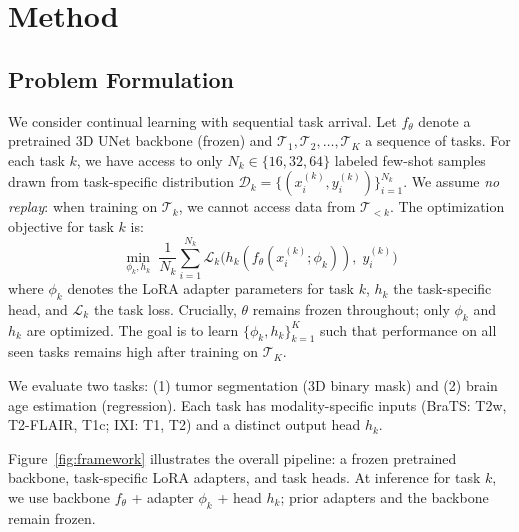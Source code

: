 \documentclass[journal,twoside,web]{ieeecolor}
\begin{document}
\section{Method}
\label{sec:method}

\subsection{Problem Formulation}
\label{sec:problem}

We consider continual learning with sequential task arrival. Let $f_\theta$ denote a pretrained 3D UNet backbone (frozen) and $\mathcal{T}_1, \mathcal{T}_2, \ldots, \mathcal{T}_K$ a sequence of tasks. For each task $k$, we have access to only $N_k \in \{16, 32, 64\}$ labeled few-shot samples drawn from task-specific distribution $\mathcal{D}_k = \{(x_i^{(k)}, y_i^{(k)})\}_{i=1}^{N_k}$. We assume \emph{no replay}: when training on $\mathcal{T}_k$, we cannot access data from $\mathcal{T}_{<k}$. The optimization objective for task $k$ is:
\begin{equation}
\min_{\phi_k, h_k} \; \frac{1}{N_k} \sum_{i=1}^{N_k} \mathcal{L}_k \bigl( h_k(f_\theta(x_i^{(k)}; \phi_k)),\; y_i^{(k)} \bigr)
\label{eq:objective}
\end{equation}
where $\phi_k$ denotes the LoRA adapter parameters for task $k$, $h_k$ the task-specific head, and $\mathcal{L}_k$ the task loss. Crucially, $\theta$ remains frozen throughout; only $\phi_k$ and $h_k$ are optimized. The goal is to learn $\{\phi_k, h_k\}_{k=1}^K$ such that performance on all seen tasks remains high after training on $\mathcal{T}_K$.

We evaluate two tasks: (1) tumor segmentation (3D binary mask) and (2) brain age estimation (regression). Each task has modality-specific inputs (BraTS: T2w, T2-FLAIR, T1c; IXI: T1, T2) and a distinct output head $h_k$.

Figure~\ref{fig:framework} illustrates the overall pipeline: a frozen pretrained backbone, task-specific LoRA adapters, and task heads. At inference for task $k$, we use backbone $f_\theta$ + adapter $\phi_k$ + head $h_k$; prior adapters and the backbone remain frozen.
\end{document}
